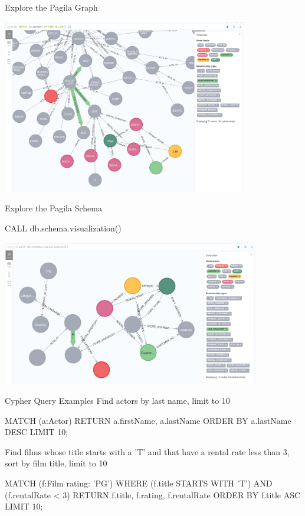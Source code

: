 \documentclass[ignorenonframetext,xcolor=x11names]{beamer}
\begin{document}
\begin{frame}{Explore the Pagila Graph}
\centering

\includegraphics[height=3in]{screen12.png}
\end{frame}

\begin{frame}[fragile]{Explore the Pagila Schema}
\small
\begin{cyphercode}
CALL db.schema.visualization()
\end{cyphercode}
\centering

\includegraphics[height=2.5in]{screen13.png}
\end{frame}

\begin{frame}[fragile]{Cypher Query Examples}
Find actors by last name, limit to 10
\footnotesize
\begin{cyphercode}
MATCH (a:Actor) 
RETURN a.firstName, a.lastName
ORDER BY a.lastName DESC
LIMIT 10;
\end{cyphercode}
\normalsize
Find films whose title starts with a 'T' and that have a rental rate less than 3, sort by film title, limit to 10
\footnotesize
\begin{cyphercode}
MATCH (f:Film {rating: 'PG'})
WHERE (f.title STARTS WITH 'T') AND (f.rentalRate < 3)
RETURN f.title, f.rating, f.rentalRate
ORDER BY f.title ASC LIMIT 10;
\end{cyphercode}
\end{frame}
\end{document}

